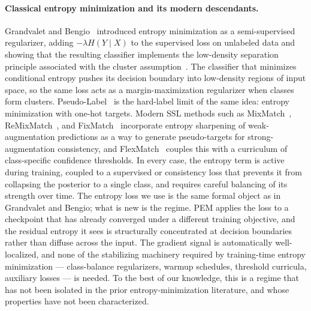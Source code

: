 \paragraph{Classical entropy minimization and its modern descendants.}
Grandvalet and Bengio~\cite{grandvalet2004entropy} introduced entropy minimization as a semi-supervised regularizer, adding $-\lambda H(Y\mid X)$ to the supervised loss on unlabeled data and showing that the resulting classifier implements the low-density separation principle associated with the cluster assumption~\cite{chapelle2006ssl}. The classifier that minimizes conditional entropy pushes its decision boundary into low-density regions of input space, so the same loss acts as a margin-maximization regularizer when classes form clusters. Pseudo-Label~\cite{lee2013pseudolabel} is the hard-label limit of the same idea: entropy minimization with one-hot targets. Modern SSL methods such as MixMatch~\cite{berthelot2019mixmatch}, ReMixMatch~\cite{berthelot2020remixmatch}, and FixMatch~\cite{sohn2020fixmatch} incorporate entropy sharpening of weak-augmentation predictions as a way to generate pseudo-targets for strong-augmentation consistency, and FlexMatch~\cite{zhang2021flexmatch} couples this with a curriculum of class-specific confidence thresholds. In every case, the entropy term is active during training, coupled to a supervised or consistency loss that prevents it from collapsing the posterior to a single class, and requires careful balancing of its strength over time. The entropy loss we use is the same formal object as in Grandvalet and Bengio; what is new is the regime. PEM applies the loss to a checkpoint that has already converged under a different training objective, and the residual entropy it sees is structurally concentrated at decision boundaries rather than diffuse across the input. The gradient signal is automatically well-localized, and none of the stabilizing machinery required by training-time entropy minimization --- class-balance regularizers, warmup schedules, threshold curricula, auxiliary losses --- is needed. To the best of our knowledge, this is a regime that has not been isolated in the prior entropy-minimization literature, and whose properties have not been characterized.

